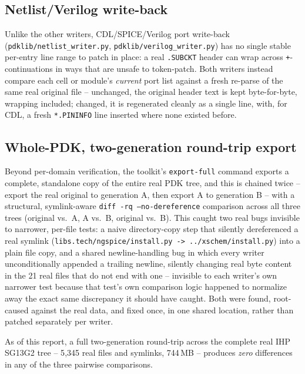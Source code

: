 \documentclass[a4paper,11pt]{article}
\begin{document}
\subsection{Netlist/Verilog write-back}
\label{sec:netlist-writeback}

Unlike the other writers, CDL/SPICE/Verilog port write-back
(\texttt{pdklib/netlist\_writer.py}, \texttt{pdklib/verilog\_writer.py}) has
no single stable per-entry line range to patch in place: a real
\texttt{.SUBCKT} header can wrap across \texttt{+}-continuations in
ways that are unsafe to token-patch. Both writers instead compare
each cell or module's \emph{current} port list against a fresh
re-parse of the same real original file -- unchanged, the original
header text is kept byte-for-byte, wrapping included; changed, it is
regenerated cleanly as a single line, with, for CDL, a fresh
\texttt{*.PININFO} line inserted where none existed before.

\subsection{Whole-PDK, two-generation round-trip export}

Beyond per-domain verification, the toolkit's \texttt{export-full}
command exports a complete, standalone copy of the entire real PDK
tree, and this is chained twice -- export the real original to
generation A, then export A to generation B -- with a structural,
symlink-aware \texttt{diff -rq --no-dereference} comparison across
all three trees (original vs.\ A, A vs.\ B, original vs.\ B). This
caught two real bugs invisible to narrower, per-file tests: a naive
directory-copy step that silently dereferenced a real symlink
(\texttt{libs.tech/ngspice/install.py -> ../xschem/install.py}) into
a plain file copy, and a shared newline-handling bug in which every
writer unconditionally appended a trailing newline, silently
changing real byte content in the 21 real files that do not end with
one -- invisible to each writer's own narrower test because that
test's own comparison logic happened to normalize away the exact
same discrepancy it should have caught. Both were found, root-caused
against the real data, and fixed once, in one shared location, rather
than patched separately per writer.

As of this report, a full two-generation round-trip across the
complete real IHP SG13G2 tree -- 5{,}345 real files and symlinks,
744\,MB -- produces \emph{zero} differences in any of the three
pairwise comparisons.
\end{document}
